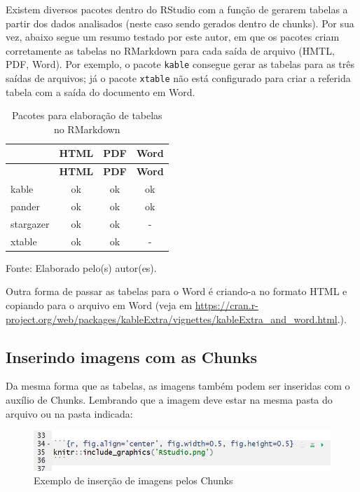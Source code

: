\documentclass[12pt,portuguese,oneside]{book}
\begin{document}
Existem diversos pacotes dentro do RStudio com a função de gerarem
tabelas a partir dos dados analisados (neste caso sendo gerados dentro
de chunks). Por sua vez, abaixo segue um resumo testado por este autor,
em que os pacotes criam corretamente as tabelas no RMarkdown para cada
saída de arquivo (HMTL, PDF, Word). Por exemplo, o pacote \texttt{kable}
consegue gerar as tabelas para as três saídas de arquivos; já o pacote
\texttt{xtable} não está configurado para criar a referida tabela com a
saída do documento em Word.

\begin{longtable}[]{@{}lccc@{}}
\caption{\label{tab:tabelasrmk}Pacotes para elaboração de tabelas no
RMarkdown}\tabularnewline
\toprule
& \textbf{HTML} & \textbf{PDF} & \textbf{Word}\tabularnewline
\midrule
\endfirsthead
\toprule
& \textbf{HTML} & \textbf{PDF} & \textbf{Word}\tabularnewline
\midrule
\endhead
kable & ok & ok & ok\tabularnewline
pander & ok & ok & ok\tabularnewline
stargazer & ok & ok & -\tabularnewline
xtable & ok & ok & -\tabularnewline
\bottomrule
\end{longtable}

Fonte: Elaborado pelo(s) autor(es).

Outra forma de passar as tabelas para o Word é criando-a no formato HTML
e copiando para o arquivo em Word (veja em
\url{https://cran.r-project.org/web/packages/kableExtra/vignettes/kableExtra_and_word.html}.).

\subsection{Inserindo imagens com as
Chunks}\label{inserindo-imagens-com-as-chunks}

Da mesma forma que as tabelas, as imagens também podem ser inseridas com
o auxílio de Chunks. Lembrando que a imagem deve estar na mesma pasta do
arquivo ou na pasta indicada:

\begin{figure}[H]

{\centering \includegraphics[width=0.8\linewidth]{rmarkchunkimg} 

}

\caption{Exemplo de inserção de imagens pelos Chunks}\label{fig:rmarkchunk333}
\end{figure}
\end{document}

